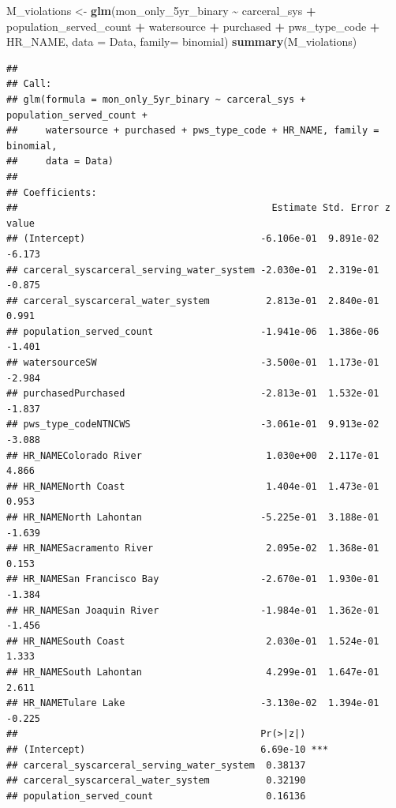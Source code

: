 \documentclass[
]{article}
\newenvironment{Shaded}{\begin{snugshade}}{\end{snugshade}}
\newcommand{\AttributeTok}[1]{\textcolor[rgb]{0.13,0.29,0.53}{#1}}
\newcommand{\FunctionTok}[1]{\textcolor[rgb]{0.13,0.29,0.53}{\textbf{#1}}}
\newcommand{\NormalTok}[1]{#1}
\newcommand{\OtherTok}[1]{\textcolor[rgb]{0.56,0.35,0.01}{#1}}
\newcommand{\SpecialCharTok}[1]{\textcolor[rgb]{0.81,0.36,0.00}{\textbf{#1}}}
\begin{document}
\begin{Shaded}
\begin{Highlighting}[]
\NormalTok{M\_violations }\OtherTok{\textless{}{-}} \FunctionTok{glm}\NormalTok{(mon\_only\_5yr\_binary }\SpecialCharTok{\textasciitilde{}}\NormalTok{ carceral\_sys }\SpecialCharTok{+}\NormalTok{ population\_served\_count }\SpecialCharTok{+}\NormalTok{ watersource }\SpecialCharTok{+}\NormalTok{ purchased }\SpecialCharTok{+}\NormalTok{ pws\_type\_code }\SpecialCharTok{+}\NormalTok{ HR\_NAME, }\AttributeTok{data =}\NormalTok{ Data, }\AttributeTok{family=}\NormalTok{ binomial)}
\FunctionTok{summary}\NormalTok{(M\_violations)}
\end{Highlighting}
\end{Shaded}

\begin{verbatim}
## 
## Call:
## glm(formula = mon_only_5yr_binary ~ carceral_sys + population_served_count + 
##     watersource + purchased + pws_type_code + HR_NAME, family = binomial, 
##     data = Data)
## 
## Coefficients:
##                                             Estimate Std. Error z value
## (Intercept)                               -6.106e-01  9.891e-02  -6.173
## carceral_syscarceral_serving_water_system -2.030e-01  2.319e-01  -0.875
## carceral_syscarceral_water_system          2.813e-01  2.840e-01   0.991
## population_served_count                   -1.941e-06  1.386e-06  -1.401
## watersourceSW                             -3.500e-01  1.173e-01  -2.984
## purchasedPurchased                        -2.813e-01  1.532e-01  -1.837
## pws_type_codeNTNCWS                       -3.061e-01  9.913e-02  -3.088
## HR_NAMEColorado River                      1.030e+00  2.117e-01   4.866
## HR_NAMENorth Coast                         1.404e-01  1.473e-01   0.953
## HR_NAMENorth Lahontan                     -5.225e-01  3.188e-01  -1.639
## HR_NAMESacramento River                    2.095e-02  1.368e-01   0.153
## HR_NAMESan Francisco Bay                  -2.670e-01  1.930e-01  -1.384
## HR_NAMESan Joaquin River                  -1.984e-01  1.362e-01  -1.456
## HR_NAMESouth Coast                         2.030e-01  1.524e-01   1.333
## HR_NAMESouth Lahontan                      4.299e-01  1.647e-01   2.611
## HR_NAMETulare Lake                        -3.130e-02  1.394e-01  -0.225
##                                           Pr(>|z|)    
## (Intercept)                               6.69e-10 ***
## carceral_syscarceral_serving_water_system  0.38137    
## carceral_syscarceral_water_system          0.32190    
## population_served_count                    0.16136    

\end{verbatim}
\end{document}
